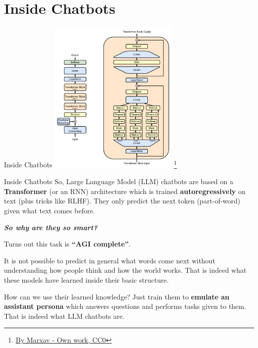 \documentclass{beamer}
\begin{document}
\section{Inside Chatbots}
\begin{frame}{Inside Chatbots}
\center
\includegraphics[height=7.5cm]{Full_GPT_architecture.png}
\footnote{\textcolor{blue}{\href{https://commons.wikimedia.org/w/index.php?curid=127066752}{By Marxav - Own work, CC0}}}
\end{frame}

\begin{frame}{Inside Chatbots}
So, Large Language Model (LLM) chatbots are based on a \textbf{Transformer} (or an RNN) architecture which is trained \textbf{autoregressively} on text (plus tricks like RLHF). They only predict the next token (part-of-word) given what text comes before.

\vspace{0.5cm}

\textbf{\textit{So why are they so smart?}}

Turns out this task is \textbf{``AGI complete''}.

It is not possible to predict in general what words come next without understanding how people think and how the world works. That is indeed what these models have learned inside their basic structure.

How can we use their learned knowledge? Just train them to \textbf{emulate an assistant persona} which answers questions and performs tasks given to them. That is indeed what LLM chatbots are.
\end{frame}
\end{document}
